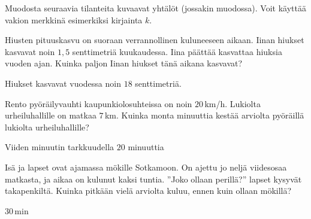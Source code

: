 \begin{tehtavasivu}
\begin{tehtava}
Muodosta seuraavia tilanteita kuvaavat yhtälöt (jossakin muodossa). Voit käyttää vakion merkkinä esimerkiksi kirjainta $k$.
	\begin{vastaus}
	\end{vastaus}
\end{tehtava}

\begin{tehtava}
Hiusten pituuskasvu on suoraan verrannollinen kuluneeseen aikaan. Iinan hiukset kasvavat noin $1,5$ senttimetriä kuukaudessa. Iina päättää kasvattaa hiuksia vuoden ajan. Kuinka paljon Iinan hiukset tänä aikana kasvavat?
	\begin{vastaus}
Hiukset kasvavat vuodessa noin $18$ senttimetriä.
	\end{vastaus}
\end{tehtava}

\begin{tehtava}
Rento pyöräilyvauhti kaupunkiolosuhteissa on noin $20$\,km/h. Lukiolta urheiluhallille on matkaa $7$\,km. Kuinka monta minuuttia kestää arviolta pyöräillä lukiolta urheiluhallille?
	\begin{vastaus}
Viiden minuutin tarkkuudella $20$ minuuttia
	\end{vastaus}
\end{tehtava}

\begin{tehtava}
Isä ja lapset ovat ajamassa mökille Sotkamoon. On ajettu jo neljä viidesosaa matkasta, ja aikaa on kulunut kaksi tuntia. ''Joko ollaan perillä?'' lapset kysyvät takapenkiltä. Kuinka pitkään vielä arviolta kuluu, ennen kuin ollaan mökillä?
    \begin{vastaus}
        $30$\,min
    \end{vastaus}
\end{tehtava}


\end{tehtavasivu}
